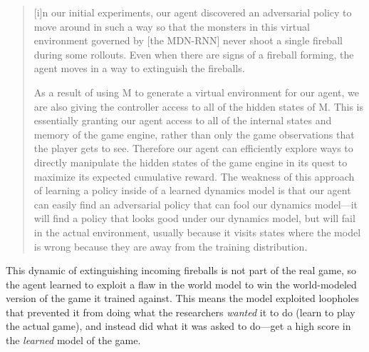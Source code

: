\begin{quote}
    [i]n our initial experiments, our agent discovered an adversarial policy to move around in such a way so that the monsters in this virtual environment governed by [the MDN-RNN] never shoot a single fireball during some rollouts. Even when there are signs of a fireball forming, the agent moves in a way to extinguish the fireballs.


    As a result of using M to generate a virtual environment for our agent, we are also giving the controller access to all of the hidden states of M. This is essentially granting our agent access to all of the internal states and memory of the game engine, rather than only the game observations that the player gets to see. Therefore our agent can efficiently explore ways to directly manipulate the hidden states of the game engine in its quest to maximize its expected cumulative reward. The weakness of this approach of learning a policy inside of a learned dynamics model is that our agent can easily find an adversarial policy that can fool our dynamics model---it will find a policy that looks good under our dynamics model, but will fail in the actual environment, usually because it visits states where the model is wrong because they are away from the training distribution.
    
\end{quote}

This dynamic of extinguishing incoming fireballs is not part of the real game, so the agent learned to exploit a flaw in the world model to win the world-modeled version of the game it trained against.
This means the model exploited loopholes that prevented it from doing what the researchers \emph{wanted} it to do (learn to play the actual game), and instead did what it was asked to do---get a high score in the \emph{learned} model of the game.
